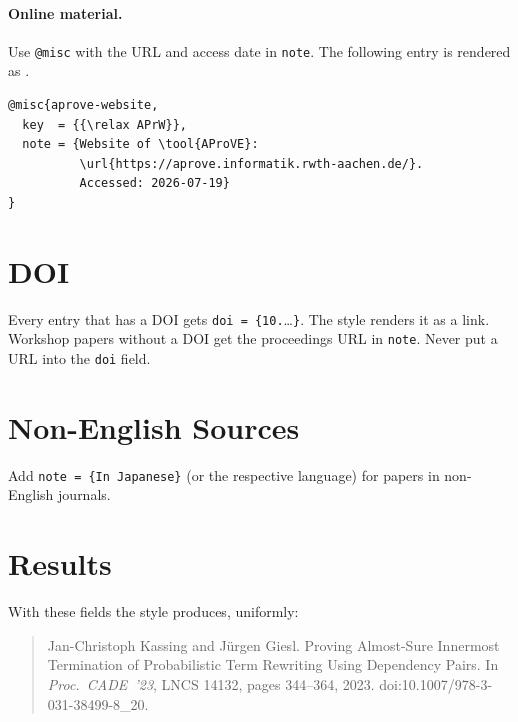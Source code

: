 \paragraph{Online material.}
Use \lstinline|@misc| with the URL and access date in \lstinline|note|.
The following entry is rendered as \cite{aprove-website}.

\begin{lstlisting}
@misc{aprove-website,
  key  = {{\relax APrW}},
  note = {Website of \tool{AProVE}:
          \url{https://aprove.informatik.rwth-aachen.de/}.
          Accessed: 2026-07-19}
}
\end{lstlisting}

\section{DOI}\label{sec:bib-doi}

Every entry that has a DOI gets \lstinline|doi = {10.|\ldots\lstinline|}|.
The style renders it as a link.
Workshop papers without a DOI get the proceedings URL in \lstinline|note|.
Never put a URL into the \lstinline|doi| field.

\section{Non-English Sources}\label{sec:bib-non-english}

Add \lstinline|note = {In Japanese}| (or the respective language) for papers
in non-English journals.

\section{Results}\label{sec:bib-results}

With these fields the style produces, uniformly:

\begin{quote}
    Jan-Christoph Kassing and Jürgen Giesl. Proving Almost-Sure Innermost
    Termination of Probabilistic Term Rewriting Using Dependency Pairs. In
    \emph{Proc.\ CADE~'23}, LNCS 14132, pages 344--364, 2023.
    doi:10.1007/978-3-031-38499-8\_20.
\end{quote}

